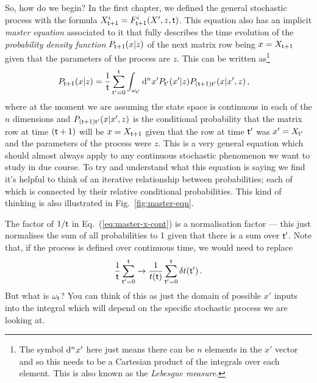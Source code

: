 So, how do we begin? In the first chapter, we defined the general stochastic process with the formula $X^{i}_{{\sf t}+1} = F^{i}_{{\sf t}+1}(X',z,{\sf t})$. This equation also has an implicit \emph{master equation} associated to it that fully describes the time evolution of the \emph{probability density function} $P_{{\sf t}+1}(x\vert z)$ of the next matrix row being $x=X_{{\sf t}+1}$ given that the parameters of the process are $z$. This can be written as\footnote{The symbol ${\rm d}^nx'$ here just means there can be $n$ elements in the $x'$ vector and so this needs to be a Cartesian product of the integrals over each element. This is also known as the \emph{Lebesgue measure}.}
\begin{align}
P_{{\sf t}+1}(x\vert z) &= \frac{1}{{\sf t}}\sum_{{\sf t}'=0}^{{\sf t}}\int_{\omega_{{\sf t}'}}{\rm d}^nx' P_{{\sf t}'}(x'\vert z) P_{({\sf t}+1){\sf t}'}(x\vert x',z) \label{eq:master-x-cont} \,,
\end{align}
where at the moment we are assuming the state space is continuous in each of the $n$ dimensions and $P_{({\sf t}+1){\sf t}'}(x\vert x',z)$ is the conditional probability that the matrix row at time $({\sf t}+1)$ will be $x=X_{{\sf t}+1}$ given that the row at time ${\sf t}'$ was $x'=X_{{\sf t}'}$ and the parameters of the process were $z$. This is a very general equation which should almost always apply to any continuous stochastic phenomenon we want to study in due course. To try and understand what this equation is saying we find it's helpful to think of an iterative relationship between probabilities; each of which is connected by their relative conditional probabilities. This kind of thinking is also illustrated in Fig.~\ref{fig:master-eqn}.

The factor of $1/{\sf t}$ in Eq.~(\ref{eq:master-x-cont}) is a normalisation factor --- this just normalises the sum of all probabilities to 1 given that there is a sum over ${\sf t}'$. Note that, if the process is defined over continuous time, we would need to replace 
\begin{align}
\frac{1}{{\sf t}}\sum_{{\sf t}'=0}^{{\sf t}} \rightarrow \frac{1}{t({\sf t})}\sum_{{\sf t}'=0}^{{\sf t}}\delta t({\sf t}') \,.
\end{align}
But what is $\omega_{\sf t}$? You can think of this as just the domain of possible $x'$ inputs into the integral which will depend on the specific stochastic process we are looking at.

